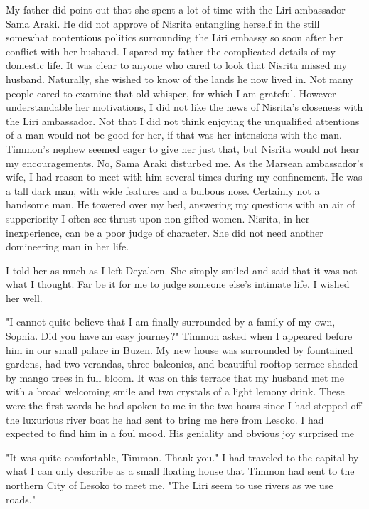\documentclass{article}
\begin{document}
My father did point out that she spent a lot of time with the Liri ambassador Sama Araki. He did not approve of Nisrita entangling herself in the still somewhat contentious politics surrounding the Liri embassy so soon after her conflict with her husband. I spared my father the complicated details of my domestic life. It was clear to anyone who cared to look that Nisrita missed my husband. Naturally, she wished to know of the lands he now lived in. Not many people cared to examine that old whisper, for which I am grateful. However understandable her motivations, I did not like the news of Nisrita's closeness with the Liri ambassador. Not that I did not think enjoying the unqualified attentions of a man would not be good for her, if that was her intensions with the man. Timmon's nephew seemed eager to give her just that, but Nisrita would not hear my encouragements. No, Sama Araki disturbed me. As the Marsean ambassador's wife, I had reason to meet with him several times during my confinement. He was a tall dark man, with wide features and a bulbous nose. Certainly not a handsome man. He towered over my bed, answering my questions with an air of supperiority I often see thrust upon non-gifted women. Nisrita, in her inexperience, can be a poor judge of character. She did not need another domineering man in her life. 

I told her as much as I left Deyalorn. She simply smiled and said that it was not what I thought. Far be it for me to judge someone else's intimate life. I wished her well.

\vspace{.5cm}

"I cannot quite believe that I am finally surrounded by a family of my own, Sophia. Did you have an easy journey?" Timmon asked when I appeared before him in our small palace in Buzen. My new house was surrounded by fountained gardens, had two verandas, three balconies, and beautiful rooftop terrace shaded by mango trees in full bloom. It was on this terrace that my husband met me with a broad welcoming smile and two crystals of a light lemony drink. These were the first words he had spoken to me in the two hours since I had stepped off the luxurious river boat he had sent to bring me here from Lesoko. I had expected to find him in a foul mood. His geniality and obvious joy surprised me

"It was quite comfortable, Timmon. Thank you." I had traveled to the capital by what I can only describe as a small floating house that Timmon had sent to the northern City of Lesoko to meet me. "The Liri seem to use rivers as we use roads."
\end{document}
